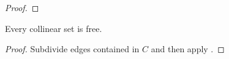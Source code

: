 \documentclass{patmorin}
\begin{document}
\begin{proof}
%
\end{proof}

\begin{cor}
  Every collinear set is free.
\end{cor}

\begin{proof}
   Subdivide edges contained in $C$ and then apply .
\end{proof}
\end{document}
